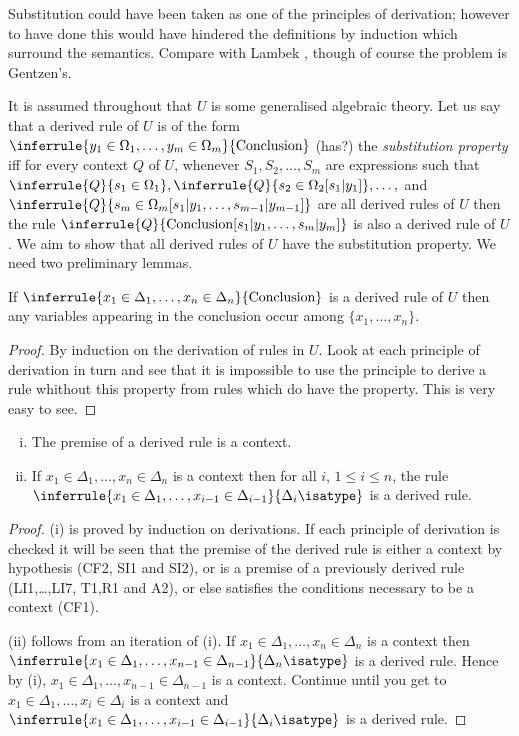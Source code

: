 Substitution could have been taken as one of the principles of derivation; however to have done this would have hindered the definitions by induction which surround the semantics.
%
Compare with Lambek \cite{??}, though of course the problem is Gentzen's.

It is assumed throughout that $U$ is some generalised algebraic theory.
%
Let us say that a derived rule of $U$ is of the form $\inferrule{y_1\in\Omega_1,\ldots,y_m\in\Omega_m}{\text{Conclusion}}$ (has?)  the \emph{substitution property} iff for every context $Q$ of $U$, whenever $S_1,S_2,\ldots,S_m$ are expressions such that $\inferrule{Q}{s_1\in\Omega_1},\inferrule{Q}{s_2\in\Omega_2[s_1|y_1]},\ldots,$ and $\inferrule{Q}{s_m\in\Omega_m[s_1|y_1,\ldots,s_{m-1}|y_{m-1}]}$ are all derived rules of $U$ then the rule $\inferrule{Q}{\text{Conclusion}[s_1|y_1,\ldots,s_m|y_m]}$ is also a derived rule of $U$. We aim to show that all derived rules of $U$ have the substitution property. We need two preliminary lemmas.

\begin{lemma}[1] If $\inferrule{x_1\in\Delta_1,\ldots,x_n\in\Delta_n}{\text{Conclusion}}$ is a derived rule of $U$ then any variables appearing in the conclusion occur among $\{x_1,\ldots, x_n\}$.
\end{lemma}
\begin{proof}
  By induction on the derivation of rules in $U$.
  Look at each principle of derivation in turn and see that it is impossible to use the principle to derive a rule whithout this property from rules which do have the property.
  This is very easy to see.
\end{proof}

\begin{lemma}[2]
  \begin{enumerate}[(i)]
    \item The premise of a derived rule is a context.
    \item If $x_1\in\Delta_1,\ldots,x_n\in\Delta_n$ is a context then for all $i$, $1\leq i\leq n$, the rule $\inferrule{x_1\in\Delta_1,\ldots,x_{i-1}\in\Delta_{i-1}}{\Delta_i\isatype}$ is a derived rule.
  \end{enumerate}
\end{lemma}
\begin{proof}
  (i) is proved by induction on derivations.
  If each principle of derivation is checked it will be seen that the premise of the derived rule is either a context by hypothesis (CF2, SI1 and SI2), or is a premise of a previously derived rule (LI1,\ldots,LI7, T1,R1 and A2), or else satisfies the conditions necessary to be a context (CF1).

  (ii) follows from an iteration of (i).
  If $x_1\in\Delta_1,\ldots,x_n\in\Delta_n$ is a context then $\inferrule{x_1\in\Delta_1,\ldots,x_{n-1}\in\Delta_{n-1}}{\Delta_n\isatype}$ is a derived rule. Hence by (i), $x_1\in\Delta_1,\ldots,x_{n-1}\in\Delta_{n-1}$ is a context.
  Continue until you get to $x_1\in\Delta_1,\ldots,x_i\in\Delta_i$ is a context and $\inferrule{x_1\in\Delta_1,\ldots,x_{i-1}\in\Delta_{i-1}}{\Delta_i\isatype}$ is a derived rule.
\end{proof}


